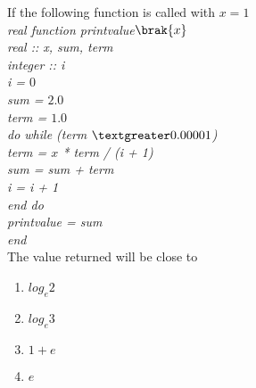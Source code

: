 \item{
If the following function is called with $x=1$\\
\textit{
real function print\textunderscore value$\brak{x}$\\
    real :: x, sum, term\\
    integer :: i\\
    i = $0$\\
    sum = $2.0$\\
    term = $1.0$\\
    do while (term $\textgreater 0.00001$)\\
        term = $x$ * term / (i + 1)\\
        sum = sum + term\\
        i = i + 1\\
    end do\\
    print\textunderscore value = sum\\
end\\
}
The value returned will be close to
\begin{multicols}{4}
\begin{enumerate}
\item $log_e2$
\item $log_e3$
\item $1+e$
\item $e$
\end{enumerate}
\end{multicols}
}
